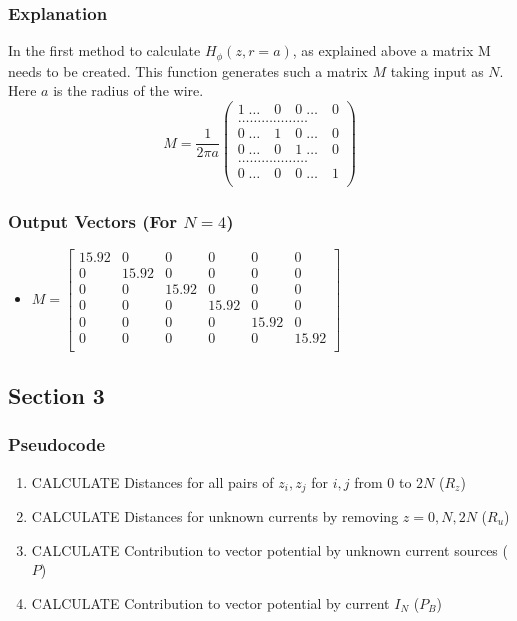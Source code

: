 \documentclass[12pt, a4paper]{article}
\begin{document}
\subsubsection{Explanation}
In the first method to calculate $H_{\phi}(z,r=a)$, as explained above a matrix M needs to be created. This function generates such a matrix $M$ taking input as $N$. Here $a$ is the radius of the wire.
\vspace*{0.4cm}
\begin{equation*}
    M = \frac{1}{2\pi a}
    \begin{pmatrix}
        1 \; \ldots \quad 0 \quad 0 \; \ldots \quad 0 \\
        \ldots \ldots \ldots \ldots \ldots \ldots \\
        0 \; \ldots \quad 1 \quad 0 \; \ldots \quad 0 \\
        0 \; \ldots \quad 0 \quad 1 \; \ldots \quad 0 \\
        \ldots \ldots \ldots \ldots \ldots \ldots \\
        0 \; \ldots \quad 0 \quad 0 \; \ldots \quad 1 \\
    \end{pmatrix}
\end{equation*}
\subsubsection{Output Vectors (For $N=4$)}
\begin{itemize}
    \item
    $ M = 
    \begin{bmatrix}
    15.92  &  0  &   0  &  0  &   0  &  0   \\
    0   & 15.92  & 0  &  0 &  0  &  0  \\
    0   & 0  & 15.92  &  0 &  0  &  0  \\
    0   & 0  & 0  &  15.92 &  0  &  0  \\
    0   & 0  & 0  &  0 &  15.92  &  0  \\
    0   & 0  & 0  &  0 &  0  &  15.92  \\
    \end{bmatrix}
    $
\end{itemize}
\subsection{Section 3}
\subsubsection{Pseudocode}
\begin{enumerate}

    \item \quad CALCULATE Distances for all pairs of $z_{i},z_{j}$ for $i,j$ from $0$ to $2N$ ($R_{z}$)
    \item \quad CALCULATE Distances for unknown currents by removing $z = 0, N, 2N$ ($R_{u}$)
    \item \quad CALCULATE Contribution to vector potential by unknown current sources ($P$)
    \item \quad CALCULATE Contribution to vector potential by current $I_{N}$ ($P_{B}$) 
  \end{enumerate}
\end{document}
